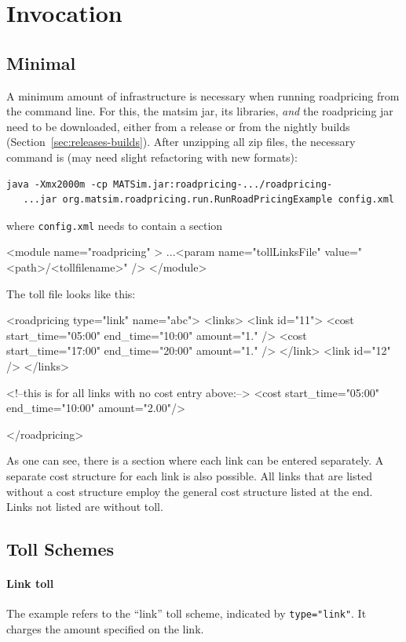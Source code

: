 \section{Invocation}
\subsection{Minimal}
A minimum amount of infrastructure is necessary when running roadpricing from the command line. For this, the \gls{matsim} \gls{jar}, its libraries, \emph{and} the roadpricing \gls{jar} need to be downloaded, either from a release or from the nightly builds (Section~\ref{sec:releases-builds}). After unzipping all zip files, the necessary command is (may need slight refactoring with new formats):
\begin{lstlisting}
java -Xmx2000m -cp MATSim.jar:roadpricing-.../roadpricing-
   ...jar org.matsim.roadpricing.run.RunRoadPricingExample config.xml  
\end{lstlisting}
where \lstinline$config.xml$ needs to contain a section
\begin{xml}
<module name="roadpricing" >
...<param name="tollLinksFile" value="<path>/<tollfilename>" />
</module>
\end{xml}
The toll file looks like this:
%
\begin{xml}
<roadpricing type="link" name="abc">
   <links>
      <link id="11">
         <cost start_time="05:00" end_time="10:00" amount="1." />
         <cost start_time="17:00" end_time="20:00" amount="1." />
      </link>             
      <link id="12" />
   </links>

   <!--this is for all links with no cost entry above:-->
   <cost start_time="05:00" end_time="10:00" amount="2.00"/>

</roadpricing>
\end{xml}
%
As one can see, there is a section where each link can be entered separately. A separate cost structure for each link is also possible. All links that are listed without a cost structure employ the general cost structure listed at the end. Links not listed are without toll.

\subsection{Toll Schemes}
\paragraph{Link toll} The example refers to the ``link'' toll scheme, indicated by \lstinline$type="link"$. It charges the amount specified on the link.


